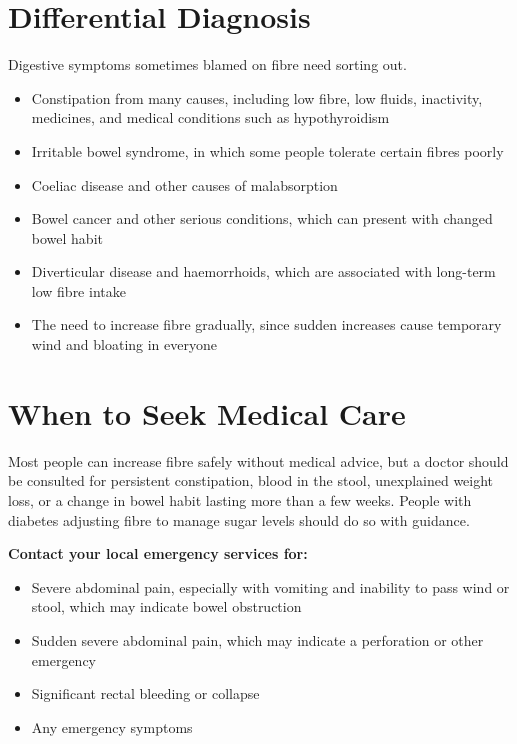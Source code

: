\section*{Differential Diagnosis}
Digestive symptoms sometimes blamed on fibre need sorting out.
\begin{itemize}
    \item Constipation from many causes, including low fibre, low fluids, inactivity, medicines, and medical conditions such as hypothyroidism
    \item Irritable bowel syndrome, in which some people tolerate certain fibres poorly
    \item Coeliac disease and other causes of malabsorption
    \item Bowel cancer and other serious conditions, which can present with changed bowel habit
    \item Diverticular disease and haemorrhoids, which are associated with long-term low fibre intake
    \item The need to increase fibre gradually, since sudden increases cause temporary wind and bloating in everyone
\end{itemize}

\section*{When to Seek Medical Care}
Most people can increase fibre safely without medical advice, but a doctor should be consulted for persistent constipation, blood in the stool, unexplained weight loss, or a change in bowel habit lasting more than a few weeks. People with diabetes adjusting fibre to manage sugar levels should do so with guidance.

\textbf{Contact your local emergency services for:}
\begin{itemize}
    \item Severe abdominal pain, especially with vomiting and inability to pass wind or stool, which may indicate bowel obstruction
    \item Sudden severe abdominal pain, which may indicate a perforation or other emergency
    \item Significant rectal bleeding or collapse
    \item Any emergency symptoms
\end{itemize}

